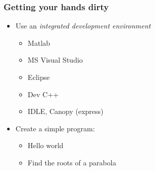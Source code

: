 \documentclass[11pt,table,final,fleqn,xcolor={usenames,dvipsnames}]{beamer}
\begin{document}
\begin{frame}
 \frametitle{Getting your hands dirty}
 \begin{itemize}
   \item Use an \emph{integrated development environment}
   \begin{itemize}
     \item Matlab
     \item MS Visual Studio
     \item Eclipse
     \item Dev C++
     \item IDLE, Canopy (express)
   \end{itemize}
   \item Create a simple program:
   \begin{itemize}
     \item Hello world
     \item Find the roots of a parabola
   \end{itemize}
 \end{itemize}
\end{frame}

% 
\end{document}
